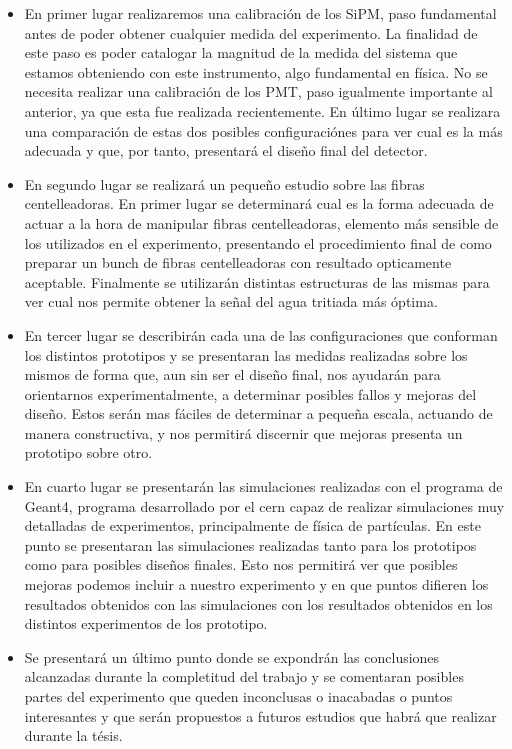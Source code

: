 \begin{itemize}
\item{} En primer lugar realizaremos una calibración de los SiPM, paso fundamental antes de poder obtener cualquier medida del experimento. La finalidad de este paso es poder catalogar la magnitud de la medida del sistema que estamos obteniendo con este instrumento, algo fundamental en física. No se necesita realizar una calibración de los PMT, paso igualmente importante al anterior, ya que esta fue realizada recientemente. 
\newline
En último lugar se realizara una comparación de estas dos posibles configuraciónes para ver cual es la más adecuada y que, por tanto, presentará el diseño final del detector.

\item{} En segundo lugar se realizará un pequeño estudio sobre las fibras centelleadoras. En primer lugar se determinará cual es la forma adecuada de actuar a la hora de manipular fibras centelleadoras, elemento más sensible de los utilizados en el experimento, presentando el procedimiento final de como preparar un bunch de fibras centelleadoras con resultado opticamente aceptable. Finalmente se utilizarán distintas estructuras de las mismas para ver cual nos permite obtener la señal del agua tritiada  más óptima. 

\item{} En tercer lugar se describirán cada una de las configuraciones que conforman los distintos prototipos y se presentaran las medidas realizadas sobre los mismos de forma que, aun sin ser el diseño final, nos ayudarán para orientarnos experimentalmente, a determinar posibles fallos y mejoras del diseño. Estos serán mas fáciles de determinar a pequeña escala, actuando de manera constructiva, y nos permitirá discernir que mejoras presenta un prototipo sobre otro. 

\item{} En cuarto lugar se presentarán las simulaciones realizadas con el programa de Geant4, programa desarrollado por el cern capaz de realizar simulaciones muy detalladas de experimentos, principalmente de física de partículas. En este punto se presentaran las simulaciones realizadas tanto para los prototipos como para posibles diseños finales. Esto nos permitirá ver que posibles mejoras podemos incluir a nuestro experimento y en que puntos difieren los resultados obtenidos con las simulaciones con los resultados obtenidos en los distintos experimentos de los prototipo.

\item{} Se presentará un último punto donde se expondrán las conclusiones alcanzadas durante la completitud del trabajo y se comentaran posibles partes del experimento que queden inconclusas o inacabadas o puntos interesantes y que serán propuestos a futuros estudios que habrá que realizar durante la tésis.
\end{itemize}

\newpage
